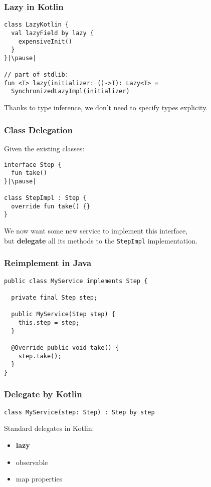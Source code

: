 \begin{frame}[fragile] \frametitle{Lazy in Kotlin}
\begin{lstlisting}
class LazyKotlin {
  val lazyField by lazy {
    expensiveInit()
  }
}|\pause|

// part of stdlib:
fun <T> lazy(initializer: ()->T): Lazy<T> =
  SynchronizedLazyImpl(initializer)
\end{lstlisting}
\pause
Thanks to type inference, we don't need to specify types explicity.
\end{frame}



\begin{frame}[fragile] \frametitle{Class Delegation}
Given the existing classes:
\begin{lstlisting}
interface Step {
  fun take()
}|\pause|

class StepImpl : Step {
  override fun take() {}
}
\end{lstlisting}
\pause
We now want some new service to implement this interface, \\
but \textbf{delegate} all its methods to the \texttt{StepImpl} implementation.
\end{frame}

\begin{frame}[fragile] \frametitle{Reimplement in Java}
\begin{lstlisting}
public class MyService implements Step {

  private final Step step;
  
  public MyService(Step step) {
    this.step = step;
  }
  
  @Override public void take() {
    step.take();
  }
}
\end{lstlisting}
\end{frame}


\begin{frame}[fragile] \frametitle{Delegate by Kotlin}
\begin{lstlisting}
class MyService(step: Step) : Step by step
\end{lstlisting}
\pause
\vspace{0.5cm}
Standard delegates in Kotlin:
\begin{itemize}
	\item \textbf{lazy}
	\item observable
	\item map properties
\end{itemize}
\end{frame}


